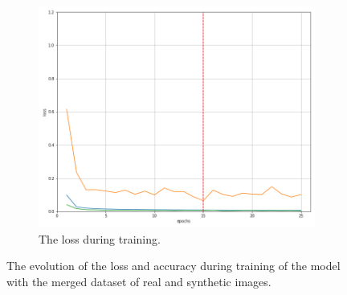 \begin{figure}[!h]
\begin{subfigure}[t]{.45\textwidth}
        \includegraphics[width=\textwidth]{images/losses13r_0.png}
        \caption{The loss during training.}
        \label{fig:lossm11}
    \end{subfigure}

    \caption{The evolution of the loss and accuracy during training of the model with the merged dataset of real and synthetic images.}
    \label{fig:lossaccm11}
\end{figure}
